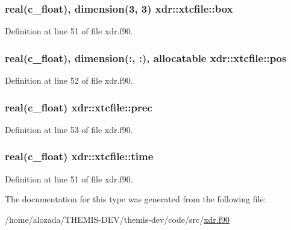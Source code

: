 \subsubsection[{\texorpdfstring{box}{box}}]{\setlength{\rightskip}{0pt plus 5cm}real(c\+\_\+float), dimension(3, 3) xdr\+::xtcfile\+::box}\hypertarget{structxdr_1_1xtcfile_a7472d3a09f388bc3f95b74a289b994ad}{}\label{structxdr_1_1xtcfile_a7472d3a09f388bc3f95b74a289b994ad}


Definition at line 51 of file xdr.\+f90.

\subsubsection[{\texorpdfstring{pos}{pos}}]{\setlength{\rightskip}{0pt plus 5cm}real(c\+\_\+float), dimension(\+:, \+:), allocatable xdr\+::xtcfile\+::pos}\hypertarget{structxdr_1_1xtcfile_abda2627be95e0de9df18e915d53a988a}{}\label{structxdr_1_1xtcfile_abda2627be95e0de9df18e915d53a988a}


Definition at line 52 of file xdr.\+f90.

\subsubsection[{\texorpdfstring{prec}{prec}}]{\setlength{\rightskip}{0pt plus 5cm}real(c\+\_\+float) xdr\+::xtcfile\+::prec}\hypertarget{structxdr_1_1xtcfile_aac421da0ff0c236f762eb81f1b726c2f}{}\label{structxdr_1_1xtcfile_aac421da0ff0c236f762eb81f1b726c2f}


Definition at line 53 of file xdr.\+f90.

\subsubsection[{\texorpdfstring{time}{time}}]{\setlength{\rightskip}{0pt plus 5cm}real(c\+\_\+float) xdr\+::xtcfile\+::time}\hypertarget{structxdr_1_1xtcfile_a8bbfbd475a67d143c56584ec6adc5851}{}\label{structxdr_1_1xtcfile_a8bbfbd475a67d143c56584ec6adc5851}


Definition at line 51 of file xdr.\+f90.



The documentation for this type was generated from the following file\+:\begin{DoxyCompactItemize}
\item 
/home/alozada/\+T\+H\+E\+M\+I\+S-\/\+D\+E\+V/themis-\/dev/code/src/\hyperlink{xdr_8f90}{xdr.\+f90}\end{DoxyCompactItemize}
